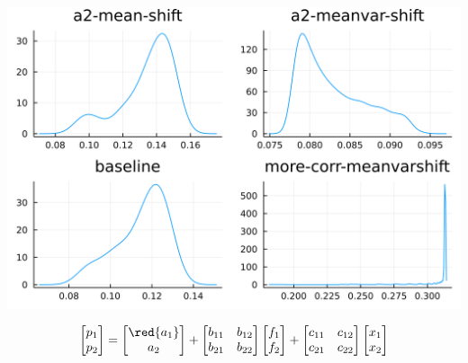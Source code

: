\documentclass[
  ignorenonframetext,
]{beamer}
\begin{document}
\begin{frame}{}
\protect\hypertarget{section-4}{}
\begin{center}\includegraphics[width=0.95\paperheight]{complexity_files/figure-beamer/unnamed-chunk-26-1} \end{center}

\[
\begin{bmatrix}
 p_1 \\ p_2
\end{bmatrix} =
\begin{bmatrix}
 \red{a_1} \\ a_2
\end{bmatrix}
 + 
 \begin{bmatrix}
 b_{11} & b_{12} \\
 b_{21} & b_{22}
\end{bmatrix}
\begin{bmatrix}
 f_1 \\ f_2
\end{bmatrix}
+
 \begin{bmatrix}
 c_{11} & c_{12} \\
 c_{21} & c_{22}
\end{bmatrix}
\begin{bmatrix}
 x_1 \\ x_2
\end{bmatrix}
\]
\end{frame}
\end{document}
